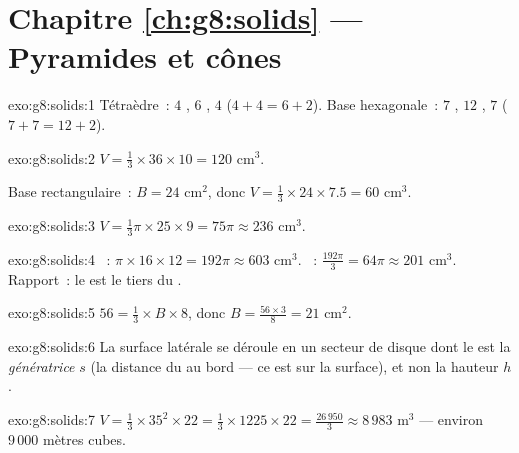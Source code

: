 \section*{Chapitre \ref{ch:g8:solids} --- Pyramides et cônes}

\begin{solution}{exo:g8:solids:1}
Tétraèdre~: $4$ , $6$ , $4$ 
($4 + 4 = 6 + 2$). Base hexagonale~: $7$ , $12$ , $7$
 ($7 + 7 = 12 + 2$).
\end{solution}

\begin{solution}{exo:g8:solids:2}
$V = \frac13 \times 36 \times 10 = 120$ cm$^3$.

Base rectangulaire~: $B = 24$ cm$^2$, donc
$V = \frac13 \times 24 \times 7.5 = 60$ cm$^3$.
\end{solution}

\begin{solution}{exo:g8:solids:3}
$V = \frac13 \pi \times 25 \times 9 = 75\pi \approx 236$ cm$^3$.
\end{solution}

\begin{solution}{exo:g8:solids:4}
~: $\pi \times 16 \times 12 = 192\pi \approx 603$ cm$^3$.
~: $\frac{192\pi}{3} = 64\pi \approx 201$ cm$^3$. Rapport~: le
 est le tiers du .
\end{solution}

\begin{solution}{exo:g8:solids:5}
$56 = \frac13 \times B \times 8$, donc $B = \frac{56 \times 3}{8} = 21$
cm$^2$.
\end{solution}

\begin{solution}{exo:g8:solids:6}
La surface latérale se déroule en un secteur de disque dont le 
est la \emph{génératrice} $s$ (la distance du  au bord --- ce
 est sur la surface), et non la hauteur $h$.
\end{solution}

\begin{solution}{exo:g8:solids:7}
$V = \frac13 \times 35^2 \times 22 = \frac13 \times 1225 \times 22
= \frac{26\,950}{3} \approx 8\,983$ m$^3$ --- environ $9\,000$ mètres
cubes.
\end{solution}

